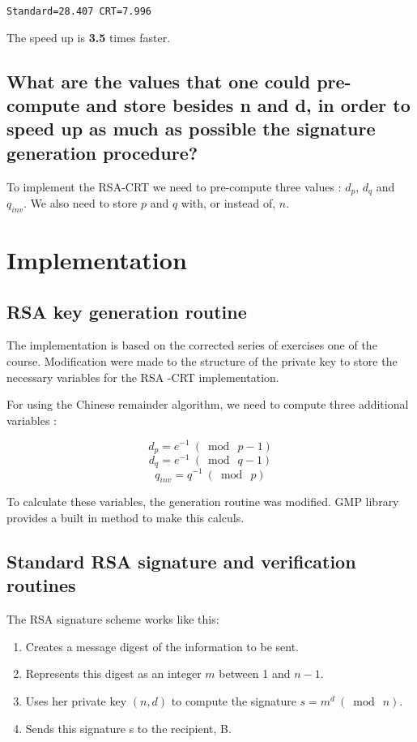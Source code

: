 \documentclass[a4paper]{report}
\begin{document}
\begin{verbatim}
Standard=28.407	CRT=7.996
\end{verbatim}

The speed up is \textbf{3.5} times faster.


\subsection{What are the values that one could pre-compute and store besides n and d, in order to speed up as much as possible the signature generation procedure?}
To implement the RSA-CRT we need to pre-compute three values : $d_p$, $d_q$ and $q_{inv}$. We also need to store $p$ and $q$ with, or instead of, $n$.


\section{Implementation}
\subsection{RSA key generation routine}
The implementation is based on the corrected series of exercises one of the course. Modification were made to the structure of the private key to store the necessary variables for the RSA -CRT implementation.


For using the Chinese remainder algorithm, we need to compute three additional variables :

\[
d_p = e^{-1} \ (\bmod{\ p - 1} )
\]
\[
d_q = e^{-1} \ (\bmod{\ q - 1} )
\]
\[
q_{inv} = q^{-1} \ ( \bmod{\ p} )
\]

To calculate these variables, the generation routine was modified. GMP library provides a built in method to make this calculs. 


\subsection{Standard RSA signature and verification routines}
The RSA signature scheme works like this:
\begin{enumerate}
    \item Creates a message digest of the information to be sent.
    \item Represents this digest as an integer $m$ between 1 and $n-1$.
    \item Uses her private key $(n, d)$ to compute the signature $s = m^d  \ (\bmod{\ n} )$.
    \item Sends this signature s to the recipient, B.
\end{enumerate}
\end{document}

